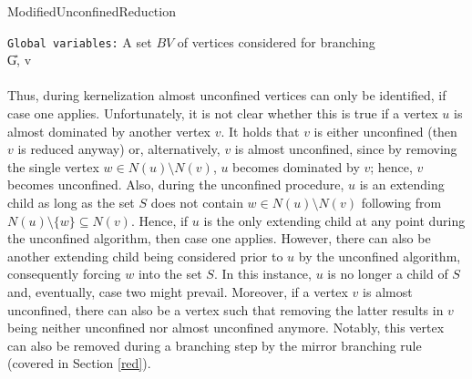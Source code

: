 \documentclass[12pt,a4paper,twoside]{scrartcl}
\numberwithin{equation}{section}
\let\oldnl\nl%
\newcommand{\nonl}{\renewcommand{\nl}{\let\nl\oldnl}}%
\begin{document}
\begin{algorithm}
	\caption{ModifiedUnconfinedReduction}\label{alg:mod_unconf}
	\DontPrintSemicolon       
	  
	  
	\nonl\texttt{Global variables:} A set $BV$ of vertices considered for branching\\
	\U{G, v}	
	
	
\end{algorithm}
\paragraph{}
Thus, during kernelization almost unconfined vertices can only be identified, if case one applies. Unfortunately, it is not clear whether this is true if a vertex $u$ is almost dominated by another vertex $v$. It holds that $v$ is either unconfined (then $v$ is reduced anyway) or, alternatively, $v$ is almost unconfined, since by removing the single vertex $w \in N(u)\setminus N(v)$, $u$ becomes dominated by $v$; hence, $v$ becomes unconfined. Also, during the unconfined procedure, $u$ is an extending child as long as the set $S$ does not contain $w\in N(u)\setminus N(v)$ following from $N(u)\setminus\{w\}\subseteq N(v)$. Hence, if $u$ is the only extending child at any point during the unconfined algorithm, then case one applies. However, there can also be another extending child being considered prior to $u$ by the unconfined algorithm, consequently forcing $w$ into the set $S$. In this instance, $u$ is no longer a child of $S$ and, eventually, case two might prevail. 
Moreover, if a vertex $v$ is almost unconfined, there can also be a vertex such that removing the latter results in $v$ being neither unconfined nor almost unconfined anymore. Notably, this vertex can also be removed during a branching step by the mirror branching rule (covered in Section \ref{red}).
\end{document}
